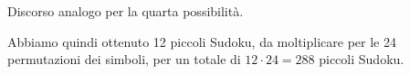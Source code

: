 {Discorso analogo per la quarta possibilità.

\begin{center}
	\hfill
	\hfill
	\hfill
	\hfill
	\hfill\mbox{}	
\end{center}

Abbiamo quindi ottenuto 12 piccoli Sudoku, da moltiplicare per le 24 permutazioni dei simboli, per un totale di $12\cdot 24=288$ piccoli
Sudoku.}

\renewcommand{\Osservazioni}{
}

\renewcommand{\Commenti}{
}